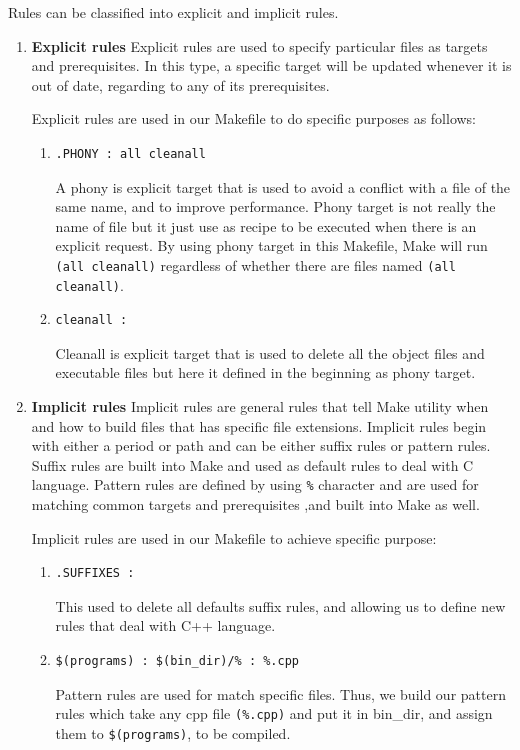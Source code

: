\documentclass[11pt]{report}
\begin{document}
\begin{enumerate}
Rules can be classified into explicit and implicit rules. 
\begin{enumerate}
\item \textbf{Explicit rules} Explicit rules are used to specify particular files as targets and prerequisites. In this type, a specific target will be updated whenever it is out of date, regarding to any of its prerequisites.

Explicit rules are used in our Makefile to do specific purposes as follows:
\begin{enumerate}
\item \begin{verbatim}
.PHONY : all cleanall
\end{verbatim}
A phony is explicit target that is used to avoid a conflict with a file of the same name, and to improve performance. Phony target is not really the name of file but it just use as recipe to be executed when there is an explicit request. By using phony target in this Makefile, Make will run \texttt{(all cleanall)} regardless of whether there are files named \texttt{(all cleanall)}.

\item \begin{verbatim}
cleanall :
\end{verbatim}
Cleanall is explicit target that is used to delete all the object files and executable files but here it defined in the beginning as phony target.
\end{enumerate}

\item \textbf{Implicit rules} Implicit rules are general rules that tell Make utility when and how to build files that has specific file extensions. Implicit rules begin with either a period or path and can be either suffix rules or pattern rules. Suffix rules are built into Make and used as default rules to deal with C language. Pattern rules are defined by using \texttt{\%} character and are used for matching common targets and prerequisites ,and built into Make as well.

Implicit rules are used in our Makefile to achieve specific purpose:
\begin{enumerate}
\item \begin{verbatim}
.SUFFIXES :
\end{verbatim}
This used to delete all defaults suffix rules, and allowing us to define new rules that deal with C++ language.

\item \begin{verbatim}
$(programs) : $(bin_dir)/% : %.cpp
\end{verbatim}
Pattern rules are used for match specific files. Thus, we build our pattern rules which take any cpp file \texttt{(\%.cpp)} and put it in bin\_dir, and assign them to \texttt{\$(programs)}, to be compiled.

\end{enumerate}
\end{enumerate}
\end{enumerate}
\end{document}
